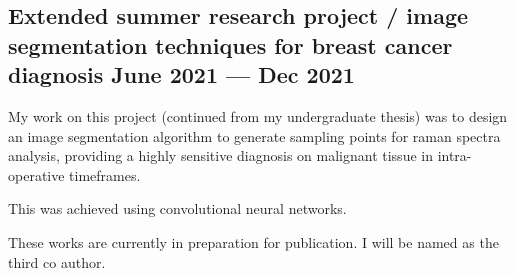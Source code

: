 \subsection{{Extended summer research project / image segmentation techniques for breast cancer diagnosis \hfill June 2021 --- Dec 2021}}
\begin{zitemize}
\item My work on this project (continued from my undergraduate thesis) was to design an image segmentation algorithm to generate sampling points for raman spectra analysis, providing a highly sensitive diagnosis on malignant tissue in intra-operative timeframes.
\item This was achieved using convolutional neural networks.
\item These works are currently in preparation for publication. I will be named as the third co author.
\end{zitemize}

